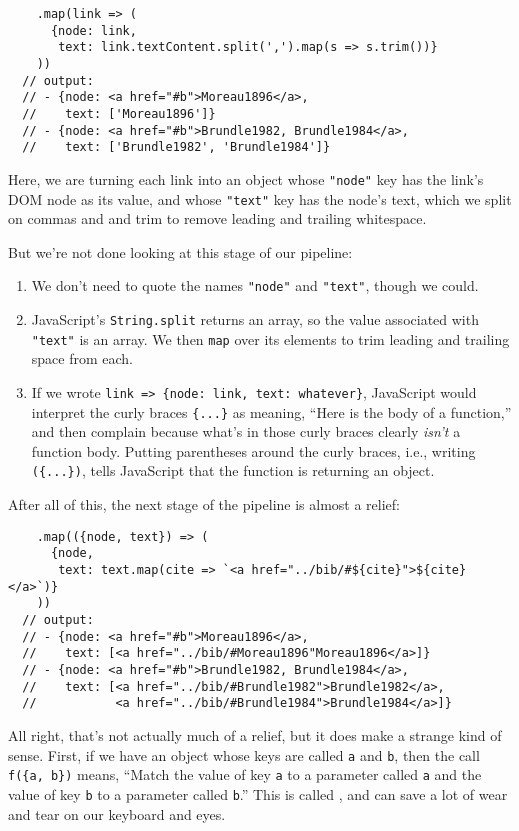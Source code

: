\begin{verbatim}
    .map(link => (
      {node: link,
       text: link.textContent.split(',').map(s => s.trim())}
    ))
  // output:
  // - {node: <a href="#b">Moreau1896</a>,
  //    text: ['Moreau1896']}
  // - {node: <a href="#b">Brundle1982, Brundle1984</a>,
  //    text: ['Brundle1982', 'Brundle1984']}
\end{verbatim}

Here,
we are turning each link into an object whose \texttt{"node"} key has the link's DOM node as its value,
and whose \texttt{"text"} key has the node's text,
which we split on commas and and trim to remove leading and trailing whitespace.

But we're not done looking at this stage of our pipeline:

\begin{enumerate}
\item
  We don't need to quote the names \texttt{"node"} and \texttt{"text"}, though we could.
\item
  JavaScript's \texttt{String.split} returns an array,
  so the value associated with \texttt{"text"} is an array.
  We then \texttt{map} over its elements to trim leading and trailing space from each.
\item
  If we wrote \texttt{link\ ={\textgreater}\ \{node:\ link,\ text:\ whatever\}},
  JavaScript would interpret the curly braces \texttt{\{...\}} as meaning,
  ``Here is the body of a function,''
  and then complain because what's in those curly braces clearly \emph{isn't} a function body.
  Putting parentheses around the curly braces,
  i.e., writing \texttt{(\{...\})},
  tells JavaScript that the function is returning an object.
\end{enumerate}

After all of this,
the next stage of the pipeline is almost a relief:

\begin{verbatim}
    .map(({node, text}) => (
      {node,
       text: text.map(cite => `<a href="../bib/#${cite}">${cite}</a>`)}
    ))
  // output:
  // - {node: <a href="#b">Moreau1896</a>,
  //    text: [<a href="../bib/#Moreau1896"Moreau1896</a>]}
  // - {node: <a href="#b">Brundle1982, Brundle1984</a>,
  //    text: [<a href="../bib/#Brundle1982">Brundle1982</a>,
  //           <a href="../bib/#Brundle1984">Brundle1984</a>]}
\end{verbatim}

All right,
that's not actually much of a relief,
but it does make a strange kind of sense.
First,
if we have an object whose keys are called \texttt{a} and \texttt{b},
then the call \texttt{f(\{a,\ b\})} means,
``Match the value of key \texttt{a} to a parameter called \texttt{a}
and the value of key \texttt{b} to a parameter called \texttt{b}.''
This is called ,
and can save a lot of wear and tear on our keyboard and eyes.

